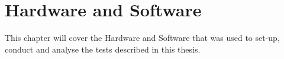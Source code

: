 \chapter{Hardware and Software}
\label{hardwareandsoftware}
This chapter will cover the Hardware and Software that was used to set-up, conduct and analyse the tests described in this thesis. 









